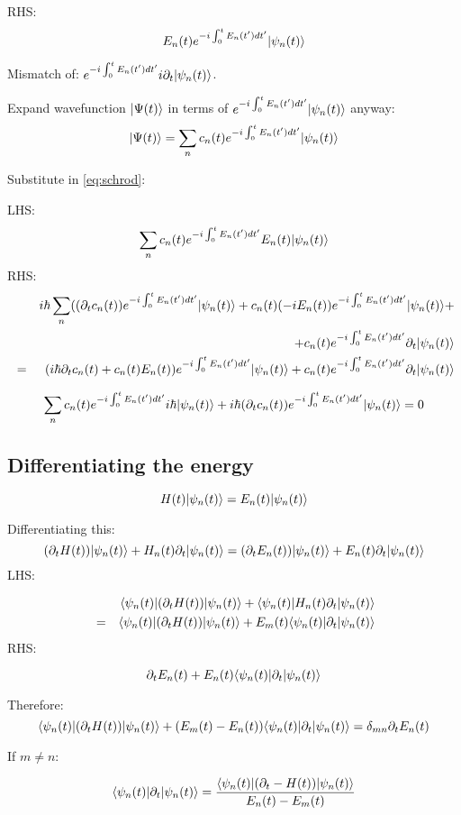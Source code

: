 \documentclass[12pt]{article}
\begin{document}
RHS:
\[
E_n(t)\phase\wpsn
\]

Mismatch of: $\phase i\dt\wpsn$.

Expand wavefunction $\wPs$ in terms of $\phase\wpsn$ anyway:
\[
\wPs = \sum_nc_n(t)\phase\wpsn
\]

Substitute in \ref{eq:schrod}:

LHS:
\[
\sum_nc_n(t)\phase E_n(t)\wpsn
\]
RHS:
\begin{eqnarray*}
& & i\hbar\sum_n((\dt c_n(t))\phase\wpsn + c_n(t)(-iE_n(t))\phase\wpsn+ \\
& &                                      + c_n(t)\phase\dt\wpsn \\
&=& (i\hbar\dt c_n(t)+c_n(t)E_n(t))\phase\wpsn+c_n(t)\phase\dt\wpsn
\end{eqnarray*}

\[
\sum_nc_n(t)\phase i\hbar\wpsn+i\hbar(\dt c_n(t))\phase\wpsn = 0
\]

\subsection{Differentiating the energy}
\[
H(t)\wpsn=E_n(t)\wpsn
\]

Differentiating this:
\[
(\dt H(t))\wpsn+H_n(t)\dt\wpsn=(\dt E_n(t))\wpsn+E_n(t)\dt\wpsn
\]
LHS:

\begin{eqnarray*}
& & \awpsm(\dt H(t))\wpsn+\awpsm H_n(t)\dt\wpsn \\
&=& \awpsm(\dt H(t))\wpsn+E_m(t)\awpsm\dt\wpsn
\end{eqnarray*}
RHS:

\[
\dt E_n(t)+E_n(t)\awpsm\dt\wpsn
\]

Therefore:
\[
\awpsm(\dt H(t))\wpsn+(E_m(t)-E_n(t))\awpsm\dt\wpsn=\delta_{mn}\dt E_n(t)
\]

If $m\ne n$:

\[
\awpsm\dt\wpsn={\awpsm(\dt -H(t))\wpsn \over E_n(t)-E_m(t)}
\]

\end{document}
